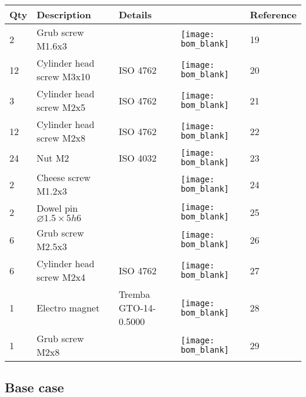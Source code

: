 \begin{tabular}{m{0.5cm} m{5cm} m{5cm} m{1cm} m{1.5cm}}
\bfseries Qty & \bfseries Description               & \bfseries Details             &                                                   & \bfseries Reference\\
\hline
2    & Grub screw M1.6x3                            &                               & \texttt{[image: bom\_blank]}           & 19    \\
\hline
12   & Cylinder head screw M3x10                    & ISO 4762                      & \texttt{[image: bom\_blank]}           & 20    \\
\hline
3    & Cylinder head screw M2x5                     & ISO 4762                      & \texttt{[image: bom\_blank]}           & 21    \\
\hline
12   & Cylinder head screw M2x8                     & ISO 4762                      & \texttt{[image: bom\_blank]}           & 22    \\
\hline
24   & Nut M2                                       & ISO 4032                      & \texttt{[image: bom\_blank]}           & 23    \\
\hline
2    & Cheese screw M1.2x3                          &                               & \texttt{[image: bom\_blank]}           & 24    \\
\hline
2    & Dowel pin $\varnothing 1.5\times5h6$         &                               & \texttt{[image: bom\_blank]}           & 25    \\
\hline
6    & Grub screw M2.5x3                            &                               & \texttt{[image: bom\_blank]}           & 26    \\
\hline
6    & Cylinder head screw M2x4                     & ISO 4762                      & \texttt{[image: bom\_blank]}           & 27    \\
\hline
1    & Electro magnet                               & Tremba GTO-14-0.5000          & \texttt{[image: bom\_blank]}           & 28    \\
\hline
1    & Grub screw M2x8                              &                               & \texttt{[image: bom\_blank]}           & 29    \\
\hline
\end{tabular}

\subsection{Base case}
\label{sec:bom-basecase}

